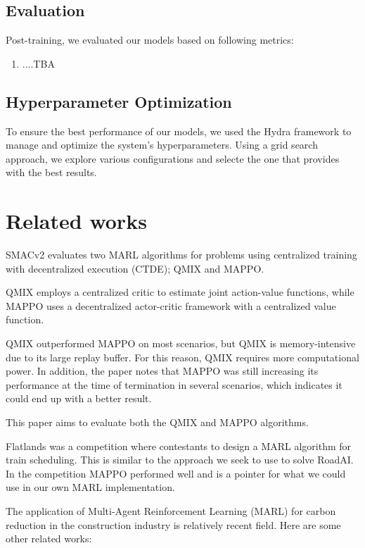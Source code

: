 \documentclass[conference]{IEEEtran}
\begin{document}
\subsection{Evaluation}
Post-training, we evaluated our models based on following metrics:
\begin{enumerate}
\item ....TBA
\end{enumerate}

\subsection{Hyperparameter Optimization}
To ensure the best performance of our models, we used the Hydra framework\cite{Yadan2019Hydra} to manage and optimize the system's hyperparameters. Using a grid search approach, we explore various configurations and selecte the one that provides with the best results.


\section{Related works}
SMACv2\cite{ellis2022smacv2} evaluates two MARL algorithms for problems using centralized training with
decentralized execution (CTDE); QMIX and MAPPO.

QMIX employs a centralized critic to estimate joint action-value functions, while MAPPO uses a decentralized
actor-critic framework with a centralized value function.

QMIX outperformed MAPPO on most scenarios, but QMIX is memory-intensive due to its large replay buffer. For
this reason, QMIX requires more computational power. In addition, the paper notes that MAPPO was still
increasing its performance at the time of termination in several scenarios, which indicates it could end up
with a better result.

This paper aims to evaluate both the QMIX and MAPPO algorithms.


Flatlands\cite{laurent2021flatland} was a competition where contestants to design a MARL algorithm for 
train scheduling. This is similar to the approach we seek to use to solve RoadAI. 
In the competition MAPPO performed well and is a pointer for what we could use in our own MARL implementation.


The application of Multi-Agent Reinforcement Learning (MARL) for carbon reduction in the construction industry is relatively recent field. Here are some other related works:
\end{document}
